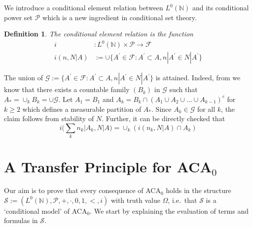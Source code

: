 \documentclass{jloganal}
\numberwithin{equation}{section}
\theoremstyle{plain}
\newtheorem{definition}[subsection]{Definition}
\renewcommand{\geq}{\geqslant}
\newcommand\N{\mathbb{N}}
\newcommand\F{\mathcal{F}}
\begin{document}
We introduce a conditional element relation between $L^0(\N)$ and its conditional power set $\mathcal{P}$ which is a new ingredient in conditional set theory.    
\begin{definition}\label{d:elementrelation}
The \emph{conditional element relation} is the function 
\begin{align*}\label{eq:element}
i &\colon L^0(\N) \times \mathcal{P}\to \mathcal{F}\\
i(n,N|A)&:=\cup\{A^\prime\in\F\colon A^\prime\subset A, n|A^\prime\in N|A^\prime\}
\end{align*}  
\end{definition}
The union of $\mathcal{G}:=\{A^\prime\in\F\colon A^\prime\subset A, n|A^\prime\in N|A^\prime\}$ is attained.    
Indeed, from \cite[Section 30, Lemma 1]{halmos09} we know that there exists a countable family $(B_k)$ in $\mathcal{G}$ such that $A_\ast=\cup_k B_k=\cup \mathcal{G}$.  
Let $A_1=B_1$ and $A_k=B_k\cap (A_1\cup A_2\cup\ldots \cup A_{k-1})^c$ for $k\geq 2$ which defines a measurable partition of $A_\ast$.    
Since $A_k\in \mathcal{G}$ for all $k$, the claim follows from stability of $N$. 
Further, it can be directly checked that
\begin{equation}\label{eq1}
i\Bigg(\sum_k n_k|A_k, N|A\Bigg) = \cup_{k} (i(n_k,N|A) \cap A_k) 
\end{equation}



\section{A Transfer Principle for ACA$_0$}\label{s3}

Our aim is to prove that every consequence of ACA$_{0}$ holds in the structure $\mathcal{S}:=(L^0(\N),\mathcal{P},+,\cdot,0,1,<, i)$ with truth value $\Omega$, i.e.~that $\mathcal{S}$ is a `conditional model' of ACA$_0$. 
We start by explaining the evaluation of terms and formulas in $\mathcal{S}$.
\end{document}
